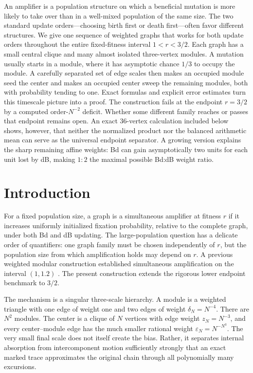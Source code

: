 \documentclass[11pt]{article}
\theoremstyle{definition}
\theoremstyle{remark}
\newcommand{\eps}{\varepsilon}
\begin{document}
An amplifier is a population structure on which a beneficial mutation is
more likely to take over than in a well-mixed population of the same size.
The two standard update orders---choosing birth first or death first---often
favor different structures.  We give one sequence of weighted graphs that
works for both update orders throughout the entire fixed-fitness interval
$1<r<3/2$.  Each graph has a small central clique and many almost isolated
three-vertex modules.  A mutation usually starts in a module, where it has
asymptotic chance $1/3$ to occupy the module.  A carefully separated set of
edge scales then makes an occupied module seed the center and makes an
occupied center sweep the remaining modules, both with probability tending
to one.  Exact formulas and explicit error estimates turn this timescale
picture into a proof.  The construction fails at the endpoint $r=3/2$ by a
computed order-$N^{-2}$ deficit.  Whether some different family reaches or
passes that endpoint remains open.  An exact 36-vertex calculation included
below shows, however, that neither the normalized product nor the balanced
arithmetic mean can serve as the universal endpoint separator.  A growing
version explains the sharp remaining affine weights: Bd can gain
asymptotically two units for each unit lost by dB, making $1:2$ the maximal
possible Bd:dB weight ratio.

\section{Introduction}

For a fixed population size, a graph is a simultaneous amplifier at fitness
$r$ if it increases uniformly initialized fixation probability, relative to
the complete graph, under both Bd and dB updating.  The large-population
question has a delicate order of quantifiers: one graph family must be
chosen independently of $r$, but the population size from which amplification
holds may depend on $r$.  A previous weighted modular construction established
simultaneous amplification on the interval $(1,1.2)$
\cite{Svoboda2024}.  The present construction extends the rigorous lower
endpoint benchmark to $3/2$.

The mechanism is a singular three-scale hierarchy.  A module is a weighted
triangle with one edge of weight one and two edges of weight
$\delta_N=N^{-4}$.  There are $N^2$ modules.  The center is a clique of $N$
vertices with edge weight $z_N=N^{-3}$, and every center--module edge has the
much smaller rational weight $\eps_N=N^{-N^3}$.  The very small final scale
does not itself create the bias.  Rather, it separates internal absorption
from intercomponent motion sufficiently strongly that an exact marked trace
approximates the original chain through all polynomially many excursions.
\end{document}
